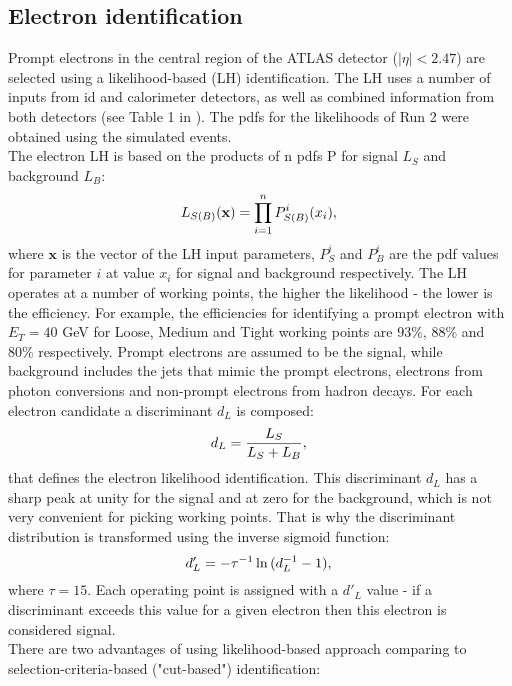     \subsection{Electron identification}
    Prompt electrons in the central region of the ATLAS detector ($|\eta|<2.47$) are selected using a likelihood-based (LH) identification. The LH uses a number of inputs from \gls{id} and calorimeter detectors, as well as combined information from both detectors (see Table 1 in \cite{electrons_reco1}). The \gls{pdfs} for the likelihoods of Run 2 were obtained using the simulated events.\\
    The electron LH is based on the products of n \gls{pdfs} P for signal $L_S$ and background $L_B$:
    \begin{equation}
    L_{S(B)}(\textbf{x}) = \prod_{i=1}^n P^i_{S(B)}(x_i),\\
    \end{equation}
    where $\textbf{x}$ is the vector of the LH input parameters, $P^i_{S}$ and $P^i_{B}$ are the pdf values for parameter $i$ at value $x_i$ for signal and background respectively.
    The LH operates at a number of working points, the higher the likelihood - the lower is the efficiency. For example, the efficiencies for identifying a prompt electron with $E_T=40$ GeV for Loose, Medium and Tight working points are 93\%, 88\% and 80\% respectively. Prompt electrons are assumed to be the signal, while background includes the jets that mimic the prompt electrons, electrons from photon conversions and non-prompt electrons from hadron decays. For each electron candidate a discriminant $d_L$ is composed:
     \begin{equation}
    d_L=\frac{L_S}{L_S+L_B},\\
    \end{equation}
    that defines the electron likelihood identification. This discriminant $d_L$ has a sharp peak at unity for the signal and at zero for the background, which is not very convenient for picking working points. That is why the discriminant distribution is transformed using the inverse sigmoid function:
     \begin{equation}
    d_L^{\prime}=-\tau^{-1}\ln{(d^{-1}_L-1)},\\
    \end{equation}
    where $\tau=15$. Each operating point is assigned with a $d'_L$ value - if a discriminant exceeds this value for a given electron then this electron is considered signal.\\
    There are two advantages of using likelihood-based approach comparing to selection-criteria-based ("cut-based") identification:
